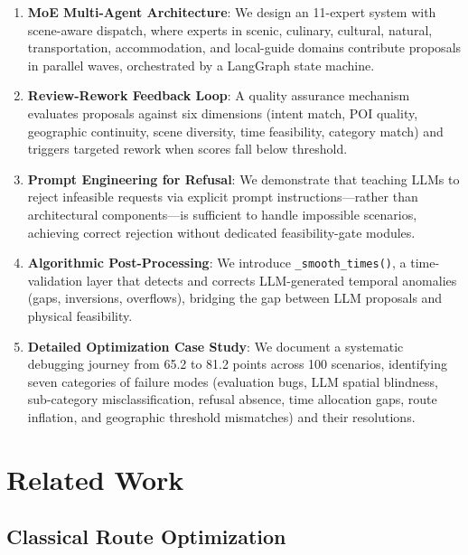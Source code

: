 \documentclass[11pt]{article}
\begin{document}
\begin{enumerate}[leftmargin=*]
    \item \textbf{MoE Multi-Agent Architecture}: We design an 11-expert system with scene-aware dispatch, where experts in scenic, culinary, cultural, natural, transportation, accommodation, and local-guide domains contribute proposals in parallel waves, orchestrated by a LangGraph state machine.

    \item \textbf{Review-Rework Feedback Loop}: A quality assurance mechanism evaluates proposals against six dimensions (intent match, POI quality, geographic continuity, scene diversity, time feasibility, category match) and triggers targeted rework when scores fall below threshold.

    \item \textbf{Prompt Engineering for Refusal}: We demonstrate that teaching LLMs to reject infeasible requests via explicit prompt instructions---rather than architectural components---is sufficient to handle impossible scenarios, achieving correct rejection without dedicated feasibility-gate modules.

    \item \textbf{Algorithmic Post-Processing}: We introduce \texttt{\_smooth\_times()}, a time-validation layer that detects and corrects LLM-generated temporal anomalies (gaps, inversions, overflows), bridging the gap between LLM proposals and physical feasibility.

    \item \textbf{Detailed Optimization Case Study}: We document a systematic debugging journey from 65.2 to 81.2 points across 100 scenarios, identifying seven categories of failure modes (evaluation bugs, LLM spatial blindness, sub-category misclassification, refusal absence, time allocation gaps, route inflation, and geographic threshold mismatches) and their resolutions.
\end{enumerate}

\section{Related Work}

\subsection{Classical Route Optimization}
\end{document}
